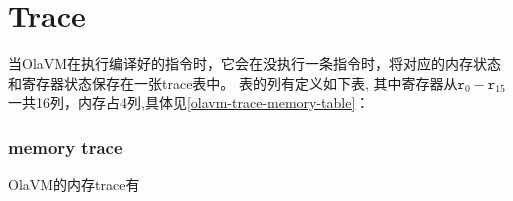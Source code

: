 \section{Trace}\label{sec: trace}
当OlaVM在执行编译好的指令时，它会在没执行一条指令时，将对应的内存状态和寄存器状态保存在一张trace表中。
表的列有定义如下表, 其中寄存器从$\texttt{r}_0 - \texttt{r}_{15}$一共16列，内存占4列,具体见\ref{olavm-trace-memory-table}：
\begin{table}[!ht]
    \centering {}
    \caption{OlaVM的trace表结构}
    \label{table: olavm-trace-`table}
\end{table}


\subsubsection{memory trace}\label{subsec: olavm-trace-memory}
OlaVM的内存trace有

\begin{table}[!ht]
    \caption{OlaVM的trace表结构}
    \label{table: olavm-trace-memory-table}
\end{table}
